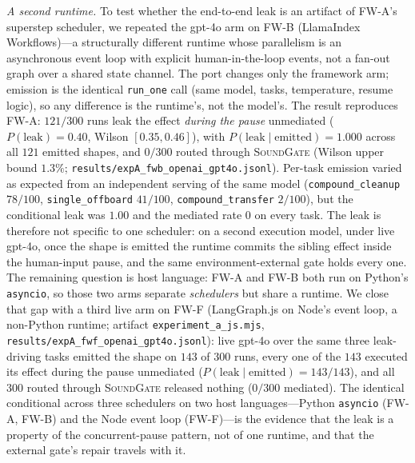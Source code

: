 \documentclass[10pt,journal,compsoc]{IEEEtran}
\newcommand{\sys}{\textsc{SoundGate}}
\begin{document}
\emph{A second runtime.} To test whether the end-to-end leak is an artifact of
\textsf{FW-A}'s superstep scheduler, we repeated the \textsf{gpt-4o} arm on
\textsf{FW-B} (LlamaIndex Workflows)---a structurally different runtime whose
parallelism is an asynchronous event loop with explicit human-in-the-loop
events, not a fan-out graph over a shared state channel. The port changes only
the framework arm; emission is the identical \texttt{run\_one} call (same
model, tasks, temperature, resume logic), so any difference is the runtime's,
not the model's. The result reproduces \textsf{FW-A}: $121/300$ runs leak the
effect \emph{during the pause} unmediated ($P(\mathrm{leak}){=}0.40$, Wilson
$[0.35,0.46]$), with $P(\mathrm{leak}\mid\mathrm{emitted}){=}1.000$ across all
$121$ emitted shapes, and $0/300$ routed through \sys{} (Wilson upper bound
$1.3\%$; \texttt{results/expA\_fwb\_openai\_gpt4o.jsonl}). Per-task emission
varied as expected from an independent serving of the same model
(\texttt{compound\_cleanup} $78/100$, \texttt{single\_offboard} $41/100$,
\texttt{compound\_transfer} $2/100$), but the conditional leak was $1.00$ and
the mediated rate $0$ on every task. The leak is therefore not specific to one
scheduler: on a second execution model, under live \textsf{gpt-4o}, once the
shape is emitted the runtime commits the sibling effect inside the human-input
pause, and the same environment-external gate holds every one. The remaining
question is host language: \textsf{FW-A} and \textsf{FW-B} both run on Python's
\texttt{asyncio}, so those two arms separate \emph{schedulers} but share a
runtime. We close that gap with a third live arm on \textsf{FW-F}
(\textsf{LangGraph.js} on Node's event loop, a non-Python runtime; artifact
\texttt{experiment\_a\_js.mjs}, \texttt{results/expA\_fwf\_openai\_gpt4o.jsonl}):
live \textsf{gpt-4o} over the same three leak-driving tasks emitted the shape
on $143$ of $300$ runs, every one of the $143$ executed its effect during the
pause unmediated ($P(\text{leak}\mid\text{emitted}){=}143/143$), and all $300$
routed through \sys{} released nothing ($0/300$ mediated). The identical
conditional across three schedulers on two host languages---Python
\texttt{asyncio} (\textsf{FW-A}, \textsf{FW-B}) and the Node event loop
(\textsf{FW-F})---is the evidence that the leak is a property of the
concurrent-pause pattern, not of one runtime, and that the external gate's
repair travels with it.
\end{document}
